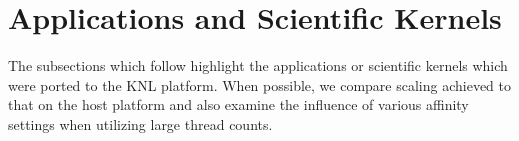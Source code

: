 
\section{Applications and Scientific Kernels}
\label{sec:apps}

The subsections which follow highlight the applications or scientific
kernels which were ported to the KNL platform. When possible, we
compare scaling achieved to that on the host platform and also examine
the influence of various affinity settings when utilizing large thread
counts.



